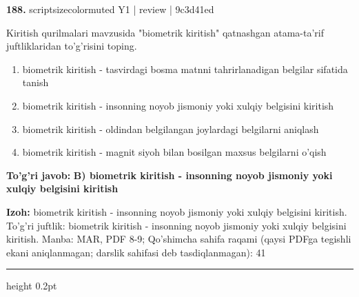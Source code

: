 \documentclass[10pt,a4paper]{article}
\begin{document}
{\bfseries\sffamily\color{ink} 188.} {scriptsizecolor{muted} Y1 | review | 9c3d41ed}
\par
Kiritish qurilmalari mavzusida "biometrik kiritish" qatnashgan atama-ta'rif juftliklaridan to'g'risini toping.
\begin{enumerate}[label=\Alph*),leftmargin=9mm]
\item biometrik kiritish - tasvirdagi bosma matnni tahrirlanadigan belgilar sifatida tanish
\item biometrik kiritish - insonning noyob jismoniy yoki xulqiy belgisini kiritish
\item biometrik kiritish - oldindan belgilangan joylardagi belgilarni aniqlash
\item biometrik kiritish - magnit siyoh bilan bosilgan maxsus belgilarni o'qish
\end{enumerate}
\begin{tcolorbox}[enhanced,breakable,colback=teal!4,colframe=teal!60!black,boxrule=0.45pt,arc=1.2mm,left=2.7mm,right=2.7mm,top=1.8mm,bottom=1.8mm,before skip=2mm,after skip=2mm]
{\bfseries\sffamily\color{teal}To'g'ri javob:} \textbf{B) biometrik kiritish - insonning noyob jismoniy yoki xulqiy belgisini kiritish}
\par\smallskip
{\bfseries Izoh:} biometrik kiritish - insonning noyob jismoniy yoki xulqiy belgisini kiritish. To'g'ri juftlik: biometrik kiritish - insonning noyob jismoniy yoki xulqiy belgisini kiritish. Manba: MAR, PDF 8-9; Qo'shimcha sahifa raqami (qaysi PDFga tegishli ekani aniqlanmagan; darslik sahifasi deb tasdiqlanmagan): 41
\end{tcolorbox}
\vspace{2mm}\hrule height 0.2pt\vspace{3mm}
\end{document}

